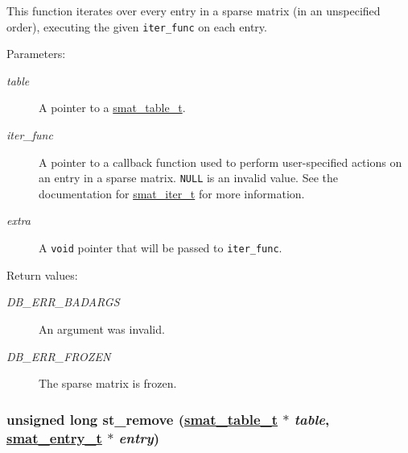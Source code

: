 This function iterates over every entry in a sparse matrix (in an unspecified order), executing the given {\tt iter\_\-func} on each entry.\begin{Desc}
\item[Parameters: ]\par
\begin{description}
\item[{\em 
table}]A pointer to a \hyperlink{group__dbprim__smat_a0}{smat\_\-table\_\-t}. \item[{\em 
iter\_\-func}]A pointer to a callback function used to perform user-specified actions on an entry in a sparse matrix. {\tt NULL} is an invalid value. See the documentation for \hyperlink{group__dbprim__smat_a4}{smat\_\-iter\_\-t} for more information. \item[{\em 
extra}]A {\tt void} pointer that will be passed to {\tt iter\_\-func}.\end{description}
\end{Desc}
\begin{Desc}
\item[Return values: ]\par
\begin{description}
\item[{\em 
DB\_\-ERR\_\-BADARGS}]An argument was invalid. \item[{\em 
DB\_\-ERR\_\-FROZEN}]The sparse matrix is frozen. \end{description}
\end{Desc}
\hypertarget{group__dbprim__smat_a11}{
\subsubsection[st\_\-remove]{\setlength{\rightskip}{0pt plus 5cm}unsigned long st\_\-remove (\hyperlink{group__dbprim__smat_a0}{smat\_\-table\_\-t} $\ast$ {\em table}, \hyperlink{group__dbprim__smat_a2}{smat\_\-entry\_\-t} $\ast$ {\em entry})}}
\label{group__dbprim__smat_a11}


